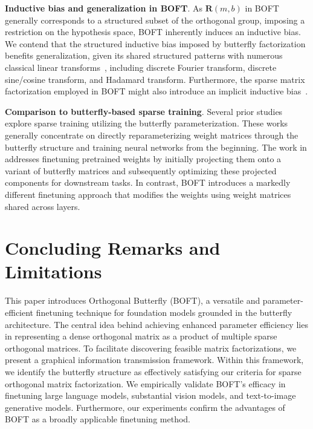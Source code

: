\textbf{Inductive bias and generalization in BOFT}. As $\bm{R}(m,b)$ in BOFT generally corresponds to a structured subset of the orthogonal group, imposing a restriction on the hypothesis space, BOFT inherently induces an inductive bias. We contend that the structured inductive bias imposed by butterfly factorization benefits generalization, given its shared structured patterns with numerous classical linear transforms~\cite{dao2019kaleidoscope}, including discrete Fourier transform, discrete sine/cosine transform, and Hadamard transform. Furthermore, the sparse matrix factorization employed in BOFT might also introduce an implicit inductive bias~\cite{gunasekar2017implicit,li2018algorithmic,liu2019neural}.

\textbf{Comparison to butterfly-based sparse training}. Several prior studies~\cite{dao2019learning,dao2019kaleidoscope,chen2022pixelated,dao2022monarch} explore sparse training utilizing the butterfly parameterization. These works generally concentrate on directly reparameterizing weight matrices through the butterfly structure and training neural networks from the beginning. The work in \cite{dao2022monarch} addresses finetuning pretrained weights by initially projecting them onto a variant of butterfly matrices and subsequently optimizing these projected components for downstream tasks. In contrast, BOFT introduces a markedly different finetuning approach that modifies the weights using weight matrices shared across layers.



\section{Concluding Remarks and Limitations}

This paper introduces Orthogonal Butterfly (BOFT), a versatile and parameter-efficient finetuning technique for foundation models grounded in the butterfly architecture. The central idea behind achieving enhanced parameter efficiency lies in representing a dense orthogonal matrix as a product of multiple sparse orthogonal matrices. To facilitate discovering feasible matrix factorizations, we present a graphical information transmission framework. Within this framework, we identify the butterfly structure as effectively satisfying our criteria for sparse orthogonal matrix factorization. We empirically validate BOFT’s efficacy in finetuning large language models, substantial vision models, and text-to-image generative models. Furthermore, our experiments confirm the advantages of BOFT as a broadly applicable finetuning method.

